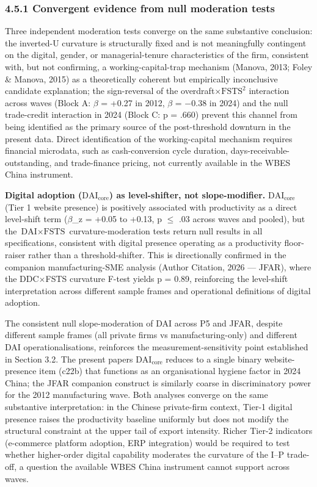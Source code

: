 \documentclass[12pt,a4paper]{article}
\begin{document}
\hypertarget{451-convergent-evidence-from-null-moderation-tests}{%
\subsubsection{4.5.1 Convergent evidence from null moderation
tests}\label{451-convergent-evidence-from-null-moderation-tests}}

Three independent moderation tests converge on the same substantive
conclusion: the inverted-U curvature is structurally fixed and is not
meaningfully contingent on the digital, gender, or managerial-tenure
characteristics of the firm, consistent with, but not confirming, a
working-capital-trap mechanism (Manova, 2013; Foley \& Manova, 2015) as
a theoretically coherent but empirically inconclusive candidate
explanation; the sign-reversal of the
overdraft\(\times\)\(\mathrm{FSTS}^2\) interaction across waves (Block
A: \(\beta\) = +0.27 in 2012, \(\beta\) = −0.38 in 2024) and the null
trade-credit interaction in 2024 (Block C: p = .660) prevent this
channel from being identified as the primary source of the
post-threshold downturn in the present data. Direct identification of
the working-capital mechanism requires financial microdata, such as
cash-conversion cycle duration, days-receivable-outstanding, and
trade-finance pricing, not currently available in the WBES China
instrument.

\textbf{Digital adoption (\(\mathrm{DAI}_{\text{core}}\)) as
level-shifter, not slope-modifier.} \(\mathrm{DAI}_{\text{core}}\) (Tier
1 website presence) is positively associated with productivity as a
direct level-shift term (\(\beta\)\_z = +0.05 to +0.13, p \(\leq\) .03
across waves and pooled), but the \(\text{DAI} \times \text{FSTS}\)
curvature-moderation tests return null results in all specifications,
consistent with digital presence operating as a productivity
floor-raiser rather than a threshold-shifter. This is directionally
confirmed in the companion manufacturing-SME analysis (Author Citation,
2026 --- JFAR), where the DDC\(\times\)FSTS curvature F-test yields p =
0.89, reinforcing the level-shift interpretation across different sample
frames and operational definitions of digital adoption.

The consistent null slope-moderation of DAI across P5 and JFAR, despite
different sample frames (all private firms vs manufacturing-only) and
different DAI operationalisations, reinforces the
measurement-sensitivity point established in Section 3.2. The present
paper\textquotesingle s \(\mathrm{DAI}_{\text{core}}\) reduces to a
single binary website-presence item (c22b) that functions as an
organisational hygiene factor in 2024 China; the JFAR companion
construct is similarly coarse in discriminatory power for the 2012
manufacturing wave. Both analyses converge on the same substantive
interpretation: in the Chinese private-firm context, Tier-1 digital
presence raises the productivity baseline uniformly but does not modify
the structural constraint at the upper tail of export intensity. Richer
Tier-2 indicators (e-commerce platform adoption, ERP integration) would
be required to test whether higher-order digital capability moderates
the curvature of the I--P trade-off, a question the available WBES China
instrument cannot support across waves.
\end{document}
